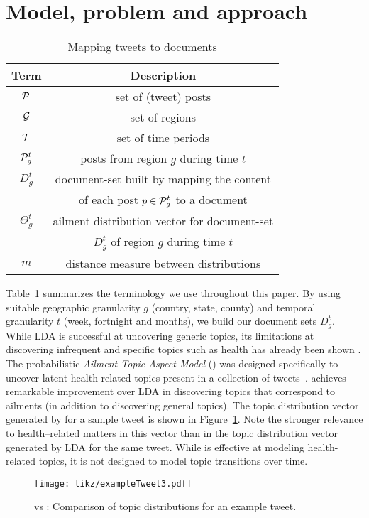 \section{Model, problem and approach}
\label{sec:background}
\begin{table}[t!]
\centering
\caption{Mapping tweets to documents}
\label{tab:model:terms}
\begin{tabular}{|c|c|}
\hline
{\bf Term} & {\bf Description}\\
\hline
$\mathcal{P}$ & set of (tweet) posts\\
\hline
$\mathcal{G}$ & set of regions\\
\hline
$\mathcal{T}$ & set of time periods\\
\hline
$\mathcal{P}_g^t$ & posts from region $g$ during time $t$\\
\hline
$D_g^t$ & document-set built by mapping the content\\
& of each post $p\in \mathcal{P}_g^t$ to a document\\
\hline
$\Theta_g^t$ & ailment distribution vector for document-set\\
& $D_g^t$ of region $g$ during time $t$\\
\hline
$m$ & distance measure between distributions\\
\hline
\end{tabular}
\end{table}
Table~\ref{tab:model:terms} summarizes the terminology we use throughout this paper. By using suitable geographic granularity $g$ (country, state, county) and temporal granularity $t$ (week, fortnight and months), we build our document sets  $D_g^t$.
While LDA is successful at uncovering generic topics, its limitations at discovering
infrequent and specific topics such as health has already been shown \cite{atam2}.
The probabilistic \emph{Ailment Topic Aspect Model} (\atam) was designed 
specifically to uncover latent health-related topics present in a 
collection of tweets~\cite{atam2}. \atam achieves
remarkable improvement over LDA in discovering topics that correspond to 
ailments (in addition to discovering general topics). The topic distribution vector generated by \atam for a sample tweet is shown 
in Figure~\ref{fig:ldavsatam}. Note the stronger relevance to 
health--related matters in this vector than in the topic distribution vector 
generated by LDA for the same tweet.
While \atam is effective at modeling health-related topics, 
it is not designed to model topic transitions over time. 
\begin{figure}[t!]
\centering
\texttt{[image: tikz/exampleTweet3.pdf]}
\caption{\lda vs \atam: Comparison of topic distributions for an example tweet.}
\label{fig:ldavsatam}
\end{figure}
